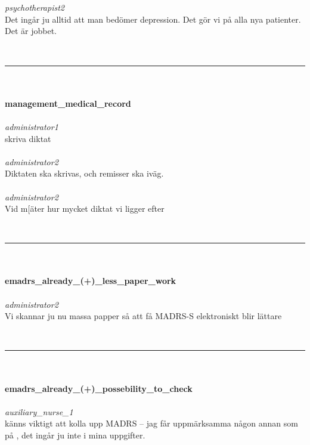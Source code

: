\documentclass[12pt,a4paper,oneside]{article}
\begin{document}
\ \\\ \\
 { \it   psychotherapist2 %
}\\
Det ing{\aa}r ju alltid att man bed{\"o}mer depression. Det g{\"o}r vi p{\aa} alla nya patienter. Det {\"a}r jobbet.  %


\ \vspace{.66em}\\
\hrule
\ \vspace{.33em}\\
\ \\{\bf management\_medical\_record }
\\\ \\%
 { \it administrator1 %
}\\
 skriva diktat %
\ \\\ \\
 { \it   administrator2 %
}\\
Diktaten ska skrivas, och remisser ska iv{\"a}g. %
\ \\\ \\
 { \it   administrator2 %
}\\
Vid m[{\"a}ter hur mycket diktat vi ligger efter %

\ \vspace{.66em}\\
\hrule
\ \vspace{.33em}\\
\ \\{\bf emadrs\_already\_(+)\_less\_paper\_work }
\\\ \\%
 { \it \it administrator2 %
}\\ 
Vi skannar ju nu massa papper s{\aa} att f{\aa} MADRS-S elektroniskt blir l{\"a}ttare %


\ \vspace{.66em}\\
\hrule
\ \vspace{.33em}\\
\ \\{\bf emadrs\_already\_(+)\_possebility\_to\_check }
\\\ \\%
 { \it \it auxiliary\_nurse\_1 %
}\\ 
 k{\"a}nns viktigt att kolla upp MADRS -- jag f{\aa}r uppm{\"a}rksamma n{\aa}gon annan som p{\aa} , det ing{\aa}r ju inte i mina uppgifter. %
\end{document}
